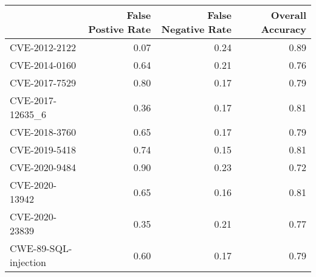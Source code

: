 \begin{tabular}{lrrr}
\toprule
{} &  False Postive Rate &  False Negative Rate &  Overall Accuracy \\
\midrule
CVE-2012-2122        &                0.07 &                 0.24 &              0.89 \\
CVE-2014-0160        &                0.64 &                 0.21 &              0.76 \\
CVE-2017-7529        &                0.80 &                 0.17 &              0.79 \\
CVE-2017-12635\_6     &                0.36 &                 0.17 &              0.81 \\
CVE-2018-3760        &                0.65 &                 0.17 &              0.79 \\
CVE-2019-5418        &                0.74 &                 0.15 &              0.81 \\
CVE-2020-9484        &                0.90 &                 0.23 &              0.72 \\
CVE-2020-13942       &                0.65 &                 0.16 &              0.81 \\
CVE-2020-23839       &                0.35 &                 0.21 &              0.77 \\
CWE-89-SQL-injection &                0.60 &                 0.17 &              0.79 \\
\bottomrule
\end{tabular}
